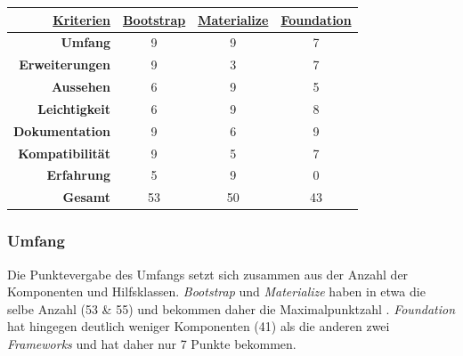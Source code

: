 	\begin{center}
		\begin{table}
			\centering
		\begin{tabular}{rccc}
			\hline
			\multicolumn{1}{|r|}{{\underline{\textbf{Kriterien}}}} & \multicolumn{1}{c|}{{\underline{\textbf{Bootstrap}}}} & \multicolumn{1}{c|}{{ \underline{\textbf{Materialize}}}} & \multicolumn{1}{c|}{{\underline{\textbf{Foundation}}}} \\ \hline
			\multicolumn{1}{|r|}{\textbf{Umfang}}          & \multicolumn{1}{c|}{9}                        & \multicolumn{1}{c|}{9}                          & \multicolumn{1}{c|}{7}                         \\ \hline
			\multicolumn{1}{|r|}{\textbf{Erweiterungen}}   & \multicolumn{1}{c|}{9}                        & \multicolumn{1}{c|}{3}                          & \multicolumn{1}{c|}{7}                         \\ \hline
			\multicolumn{1}{|r|}{\textbf{Aussehen}}        & \multicolumn{1}{c|}{6}                        & \multicolumn{1}{c|}{9}                          & \multicolumn{1}{c|}{5}                         \\ \hline
			\multicolumn{1}{|r|}{\textbf{Leichtigkeit}}    & \multicolumn{1}{c|}{6}                        & \multicolumn{1}{c|}{9}                          & \multicolumn{1}{c|}{8}                         \\ \hline
			\multicolumn{1}{|r|}{\textbf{Dokumentation}}   & \multicolumn{1}{c|}{9}                        & \multicolumn{1}{c|}{6}                          & \multicolumn{1}{c|}{9}                         \\ \hline
			\multicolumn{1}{|r|}{\textbf{Kompatibilität}}  & \multicolumn{1}{c|}{9}                        & \multicolumn{1}{c|}{5}                          & \multicolumn{1}{c|}{7}                         \\ \hline
			\multicolumn{1}{|r|}{\textbf{Erfahrung}}       & \multicolumn{1}{c|}{5}                        & \multicolumn{1}{c|}{9}                          & \multicolumn{1}{c|}{0}                         \\ \hline
			\textbf{Gesamt}                                & 53                                            & 50                                              & 43                                            
		\end{tabular}
	\end{table}
	\end{center}
\subsubsection{Umfang}
\label{chapter:study-frontend-vergleich-umfang}
Die Punktevergabe des Umfangs setzt sich zusammen aus der Anzahl der Komponenten und Hilfsklassen. \textit{Bootstrap} und \textit{Materialize} haben in etwa die selbe Anzahl (53 \& 55) und bekommen daher die Maximalpunktzahl \cite{bootstrap-docu,WebDocMaterialize,foundation-webdocu}. \textit{Foundation} hat hingegen deutlich weniger Komponenten (41) als die anderen zwei \textit{Frameworks} und hat daher nur 7 Punkte bekommen.
